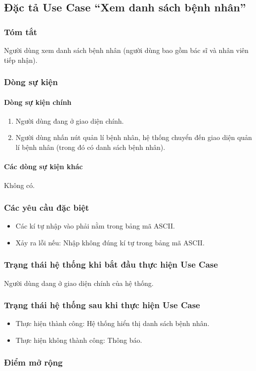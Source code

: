\subsection{Đặc tả Use Case ``Xem danh sách bệnh nhân''}

\subsubsection{Tóm tắt}
Người dùng xem danh sách bệnh nhân (người dùng bao gồm bác sĩ và nhân viên tiếp nhận).

\subsubsection{Dòng sự kiện}
\paragraph{\textbf{Dòng sự kiện chính}}
\begin{enumerate}
  \item Người dùng đang ở giao diện chính.
  \item Người dùng nhấn nút quản lí bệnh nhân, hệ thống chuyển đến giao diện quản lí bệnh nhân (trong đó có danh sách bệnh nhân).
\end{enumerate}

\paragraph{\textbf{Các dòng sự kiện khác}}
Không có.

\subsubsection{Các yêu cầu đặc biệt}
\begin{itemize}
  \item Các kí tự nhập vào phải nằm trong bảng mã ASCII.
  \item Xảy ra lỗi nếu: Nhập không đúng kí tự trong bảng mã ASCII.
\end{itemize}

\subsubsection{Trạng thái hệ thống khi bắt đầu thực hiện Use Case}
Người dùng dang ở giao diện chính của hệ thống.

\subsubsection{Trạng thái hệ thống sau khi thực hiện Use Case}
\begin{itemize}
  \item Thực hiện thành công: Hệ thống hiển thị danh sách bệnh nhân.
  \item Thực hiện không thành công: Thông báo.
\end{itemize}

\subsubsection{Điểm mở rộng}